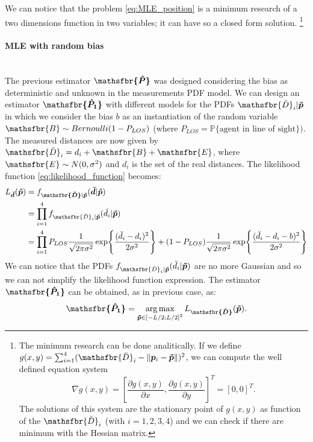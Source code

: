 \documentclass[%
    twoside, 
    a4paper
    ]{article}
\DeclareMathOperator*{\argmax}{arg\,max}
\DeclareRobustCommand{\msf}[1]{%
  \ifcat\noexpand#1\relax\msfgreek{#1}\else\mathsfbr{#1}\fi%
}
\begin{document}
    We can notice that the problem \ref{eq:MLE_position} is a minimum research of a two dimensions function in two 
    variables; it can have so a closed form solution.
    \footnote{
        The minimum research can be done analitically. If we define $ g(x,y) = \sum_{i=1}^4 (\msf{\breve{D}}_i - \lVert \bm{p}_i - \bm{\tilde{p}} \rVert)^2$,
        we can compute the well defined equation system
        \begin{equation*}
            \nabla g(x,y) = \left[ \frac{\partial g(x,y)}{\partial x}, \frac{\partial g(x,y)}{\partial y} \right]^T = [0,0]^T.
        \end{equation*}
        The solutions of this system are the stationary point of $g(x,y)$ as function of the $\msf{\breve{D}}_i$ (with $i=1,2,3,4$)
         and we can check if there are minimum with 
        the Hessian matrix.
    } 

    \paragraph{MLE with random bias} \mbox{} \\
    The previous estimator $\bm{\msf{\hat{P}}} $ was designed considering the bias as deterministic and unknown 
    in the measurements PDF model. We can design an estimator 
    $\bm{\msf{\hat{P}_1}} $ with different models for the PDFs $\msf{\breve{D}}_i|\bm{\tilde{p}}$ in 
    which we consider the bias $b$ as an instantiation of the random variable $\msf{B} \sim Bernoulli(1-P_{LOS})$
    (where $P_{LOS} = \mathbb{P}\{ \textrm{agent in line of sight} \})$.
    The measured distances are now given by $\msf{\breve{D}}_i = d_i + \msf{B} + \msf{E} $, where 
    $\msf{E} \sim N(0,\sigma^2)$ and $d_i$ is the set of the real distances.
    The likelihood function \ref{eq:likelihood_function} becomes:
    \begin{subequations}
        \begin{align}
            L_{\bm{\breve{d}}}(\bm{\tilde{p}}) &= f_{\bm{\msf{\breve{D}}}|\bm{\tilde{p}}}(\bm{\breve{d}}|\bm{\tilde{p}}) \\
            &= \prod_{i=1}^{4} f_{\msf{\breve{D}}_i|\bm{\tilde{p}}}(\breve{d}_i|\bm{\tilde{p}}) \\
            &= \prod_{i=1}^{4} P_{LOS} \frac{1}{\sqrt{2 \pi \sigma^2}} \exp{\frac{(\breve{d}_i - d_i)^2}{2 \sigma^2}} + (1-P_{LOS}) \frac{1}{\sqrt{2 \pi \sigma^2}} \exp{\frac{(\breve{d}_i - d_i - b)^2}{2 \sigma^2}}
        \end{align}
        \label{eq:likelihood_randomB}
    \end{subequations}
    We can notice that the PDFs $f_{\msf{\breve{D}}_i|\bm{\tilde{p}}}(\breve{d}_i|\bm{\tilde{p}})$ are no more
    Gaussian and so we can not simplify the likelihood function expression.
    The estimator $\bm{\msf{\hat{P}_1}} $ can be obtained, as in previous case, as:
    \begin{equation}
        \bm{\msf{\hat{P}_1}} = \argmax_{\bm{\tilde{p}} \in \left[-L/2;L/2\right]^2} L_{\bm{\msf{\breve{D}}}}(\bm{\tilde{p}}).
        \label{eq:MLE_randomB}
    \end{equation}
\end{document}
